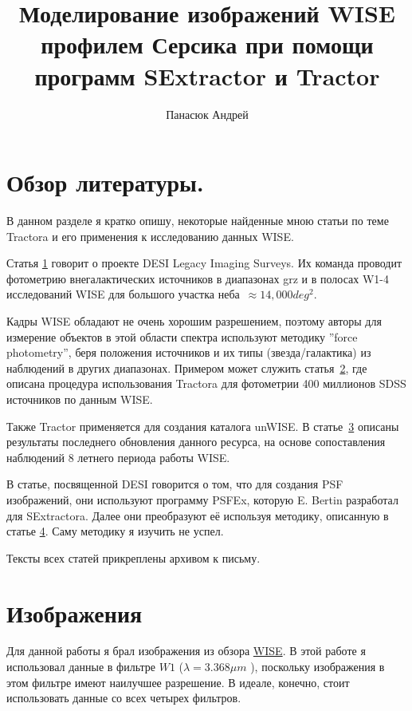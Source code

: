 \documentclass[12pt,a4paper]{article}
\title{Моделирование изображений WISE профилем Серсика при помощи программ SExtractor и Tractor}
\author{Панасюк Андрей}
\begin{document}
	
\maketitle
\thispagestyle{empty}

\newpage
\tableofcontents

\newpage
\section{Обзор литературы.}

В данном разделе я кратко опишу, некоторые найденные мною статьи по теме Tractora и его применения к исследованию данных WISE.

Статья \hyperref[1]{1} говорит о проекте DESI Legacy Imaging Surveys. Их команда проводит фотометрию внегалактических источников в диапазонах grz и в полосах W1-4 исследований WISE для большого участка неба~$\approx 14,000 deg^2$.

Кадры WISE обладают не очень хорошим разрешением, поэтому авторы для измерение объектов в этой области спектра используют методику ''force photometry'', беря положения источников и их типы (звезда/галактика) из наблюдений в других диапазонах. Примером может служить статья~\hyperref[2]{2}, где описана процедура использования Tractora для фотометрии 400 миллионов SDSS источников по данным WISE. 

Также Tractor применяется для создания каталога unWISE. В статье~\hyperref[3]{3} описаны результаты последнего обновления данного ресурса, на основе сопоставления наблюдений 8 летнего периода работы WISE.

В статье, посвященной DESI говорится о том, что для создания PSF изображений, они используют программу PSFEx, которую E. Bertin разработал для SExtractora. Далее они преобразуют её используя методику, описанную в статье \hyperref[4]{4}. Саму методику я изучить не успел.

Тексты всех статей прикреплены архивом к письму.

\section{Изображения}

Для данной работы я брал изображения из обзора \href{https://irsa.ipac.caltech.edu/applications/wise/}{WISE}. В этой работе я использовал данные в фильтре $W1$ ($\lambda = 3.368 \mu m$ ), поскольку изображения в этом фильтре имеют наилучшее разрешение. В идеале, конечно, стоит использовать данные со всех четырех фильтров. 
\end{document}
